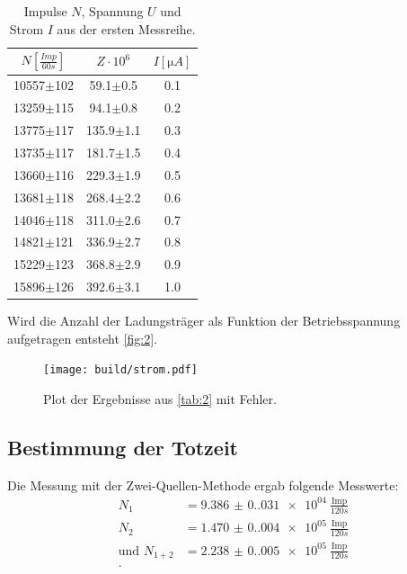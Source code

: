 \begin{table}[H]
  \centering
  \caption{Impulse $N$, Spannung $U$ und Strom $I$ aus der ersten Messreihe.}
  \begin{tabular}{c c c}
      \toprule
      {$N[\unit{\frac{Imp}{60s}}]$} & {$Z \cdot 10^6$} & {$I[\unit{\micro A}]$}\\
      \midrule
      10557$\pm$102 & 59.1$\pm$0.5 & 0.1\\
      13259$\pm$115 & 94.1$\pm$0.8 & 0.2\\
      13775$\pm$117 & 135.9$\pm$1.1 & 0.3\\
      13735$\pm$117 & 181.7$\pm$1.5 & 0.4\\
      13660$\pm$116 & 229.3$\pm$1.9 & 0.5\\
      13681$\pm$118 & 268.4$\pm$2.2 & 0.6\\
      14046$\pm$118 & 311.0$\pm$2.6 & 0.7\\
      14821$\pm$121 & 336.9$\pm$2.7 & 0.8\\
      15229$\pm$123 & 368.8$\pm$2.9 & 0.9\\
      15896$\pm$126 & 392.6$\pm$3.1 & 1.0\\
      \bottomrule
  \end{tabular}
  \label{tab:2}
\end{table}

Wird die Anzahl der Ladungsträger als Funktion der Betriebsspannung aufgetragen entsteht \autoref{fig:2}.

\begin{figure}[H]
  \texttt{[image: build/strom.pdf]}
  \caption{Plot der Ergebnisse aus \autoref{tab:2} mit Fehler.}
  \label{fig:2}
\end{figure}

\subsection{Bestimmung der Totzeit}
Die Messung mit der Zwei-Quellen-Methode ergab folgende Messwerte:
\begin{align*}
  N_1 &= \SI{9.386(0.031)e+04}{\frac{\text{Imp}}{120s}}\\
  N_2 &= \SI{1.470(0.004)e+05}{\frac{\text{Imp}}{120s}}\\
  \text{und } N_{1+2} &= \SI{2.238(0.005)e+05}{\frac{\text{Imp}}{120s}}\\.
\end{align*}

